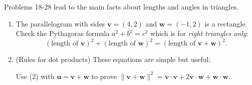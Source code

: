 \documentclass[14pt, a4paper]{article}
\begin{document}
\noindent Problems 18-28 lead to the main facts about lengths and angles in triangles.
\begin{enumerate}[resume]
    \item The parallelogram with sides $\boldsymbol{v} = (4,2)$ and $\boldsymbol{w} = (-1,2)$ is a rectangle. Check the Pythagoras formula $a^2 + b^2 = c^2$ which is for \emph{right triangles only}:
          \[
              \boxed{(\text{length of } \boldsymbol{v})^2 + (\text{length of } \boldsymbol{w})^2 = (\text{length of } \boldsymbol{v} + \boldsymbol{w})^2.}
          \]

    \item (Rules for dot products) These equations are simple but useful:
          \begin{enumerate}
          \end{enumerate}
          Use (2) with $\boldsymbol{u} = \boldsymbol{v} + \boldsymbol{w}$ to prove
          $\|\boldsymbol{v} + \boldsymbol{w}\|^2 = \boldsymbol{v} \cdot \boldsymbol{v} + 2\boldsymbol{v} \cdot \boldsymbol{w} + \boldsymbol{w} \cdot \boldsymbol{w}.$


\end{enumerate}
\end{document}
